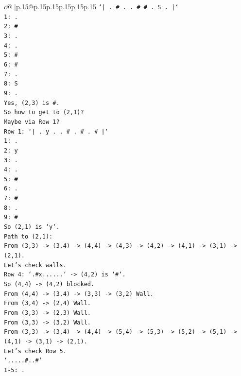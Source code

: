 \documentclass{article}
\begin{document}
{\begin{supertabular}{c@{$\;$}|p{.15\linewidth}@{}p{.15\linewidth}p{.15\linewidth}p{.15\linewidth}p{.15\linewidth}p{.15\linewidth}}
{{{\texttt{`| . \# . . \# \# . S . |`} \\
\texttt{1: .} \\
\texttt{2: \#} \\
\texttt{3: .} \\
\texttt{4: .} \\
\texttt{5: \#} \\
\texttt{6: \#} \\
\texttt{7: .} \\
\texttt{8: S} \\
\texttt{9: .} \\
\texttt{Yes, (2,3) is \#.} \\
\texttt{So how to get to (2,1)?} \\
\texttt{Maybe via Row 1?} \\
\texttt{Row 1: `| . y . . \# . \# . \# |`} \\
\texttt{1: .} \\
\texttt{2: y} \\
\texttt{3: .} \\
\texttt{4: .} \\
\texttt{5: \#} \\
\texttt{6: .} \\
\texttt{7: \#} \\
\texttt{8: .} \\
\texttt{9: \#} \\
\texttt{So (2,1) is `y`.} \\
\texttt{Path to (2,1):} \\
\texttt{From (3,3) {-}> (3,4) {-}> (4,4) {-}> (4,3) {-}> (4,2) {-}> (4,1) {-}> (3,1) {-}> (2,1).} \\
\texttt{Let's check walls.} \\
\texttt{Row 4: `.\#x......` {-}> (4,2) is `\#`.} \\
\texttt{So (4,4) {-}> (4,2) blocked.} \\
\texttt{From (4,4) {-}> (3,4) {-}> (3,3) {-}> (3,2) Wall.} \\
\texttt{From (3,4) {-}> (2,4) Wall.} \\
\texttt{From (3,3) {-}> (2,3) Wall.} \\
\texttt{From (3,3) {-}> (3,2) Wall.} \\
\texttt{From (3,3) {-}> (3,4) {-}> (4,4) {-}> (5,4) {-}> (5,3) {-}> (5,2) {-}> (5,1) {-}> (4,1) {-}> (3,1) {-}> (2,1).} \\
\texttt{Let's check Row 5.} \\
\texttt{`.....\#..\#`} \\
\texttt{1{-}5: .} \\
}}}
\end{supertabular}}
\end{document}
